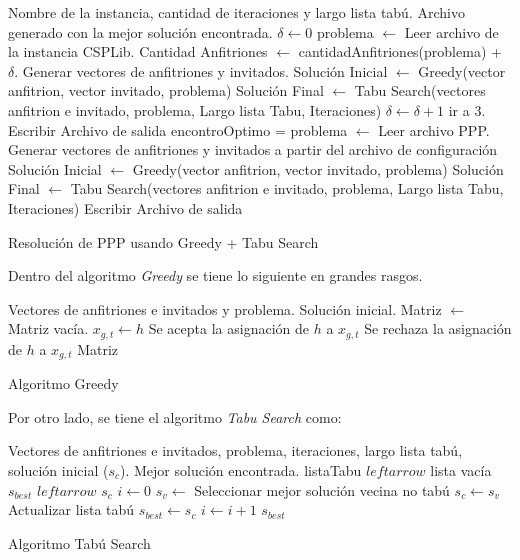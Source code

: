 \documentclass[letter, 10pt]{article}
\begin{document}
\begin{algorithm}[H]
\begin{algorithmic}[1]
\REQUIRE Nombre de la instancia, cantidad de iteraciones y largo lista tabú.
\ENSURE Archivo generado con la mejor solución encontrada.
\STATE $\delta \leftarrow 0$
\STATE problema $\leftarrow$ Leer archivo de la instancia CSPLib.
\STATE Cantidad Anfitriones $\leftarrow$ cantidadAnfitriones(problema) + $\delta$.
\STATE Generar vectores de anfitriones y invitados.
\STATE Solución Inicial $\leftarrow$ Greedy(vector anfitrion, vector invitado, problema)
\STATE Solución Final $\leftarrow$ Tabu Search(vectores anfitrion e invitado, problema, Largo lista Tabu, Iteraciones)
\STATE $\delta \leftarrow \delta + 1$
\STATE ir a 3.
\ELSE
\STATE Escribir Archivo de salida
\STATE encontroOptimo = \TRUE
\ENDIF
\ENDWHILE
\ENDIF
{}
\STATE problema $\leftarrow$ Leer archivo PPP.
\STATE Generar vectores de anfitriones y invitados a partir del archivo de configuración
\STATE Solución Inicial $\leftarrow$ Greedy(vector anfitrion, vector invitado, problema)
\STATE Solución Final $\leftarrow$ Tabu Search(vectores anfitrion e invitado, problema, Largo lista Tabu, Iteraciones)
\STATE Escribir Archivo de salida
\ENDIF
\end{algorithmic}
\caption{Resolución de PPP usando Greedy + Tabu Search}
\end{algorithm}

Dentro del algoritmo \textit{Greedy} se tiene lo siguiente en grandes rasgos.

\begin{algorithm}[H]
\begin{algorithmic}[1]
\REQUIRE Vectores de anfitriones e invitados y problema.
\ENSURE Solución inicial.
\STATE Matriz $\leftarrow$ Matriz vacía.
\STATE $x_{g,t}\leftarrow h$
\STATE Se acepta la asignación de $h$ a $x_{g,t}$
\ELSE
\STATE Se rechaza la asignación de $h$ a $x_{g,t}$
\ENDIF
\ENDFOR
\ENDFOR
\ENDFOR
\RETURN Matriz
\end{algorithmic}
\caption{Algoritmo Greedy}
\end{algorithm}

Por otro lado, se tiene el algoritmo \textit{Tabu Search} como:

\begin{algorithm}[H]
\begin{algorithmic}[1]
\REQUIRE Vectores de anfitriones e invitados, problema, iteraciones, largo lista tabú, solución inicial ($s_c$).
\ENSURE Mejor solución encontrada.
\STATE listaTabu $leftarrow$ lista vacía
\STATE $s_{best}$ $leftarrow$ $s_c$
\STATE $i\leftarrow 0$
\STATE $s_v \leftarrow$ Seleccionar mejor solución vecina no tabú
\STATE $s_c \leftarrow s_v$
\STATE Actualizar lista tabú
\STATE $s_{best}\leftarrow s_c$
\ENDIF
\STATE $i\leftarrow i + 1$
\ENDWHILE
\RETURN $s_{best}$
\end{algorithmic}
\caption{Algoritmo Tabú Search}
\end{algorithm}
\end{document}
